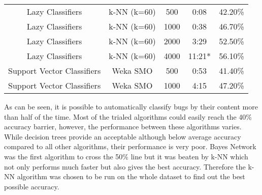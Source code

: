 \begin{tabular}{|c|c|c|c|c|}
Lazy Classifiers & k-NN (k=60) &   500  &   0:08  &    42.20\%  \\
Lazy Classifiers & k-NN (k=60) &  1000  &   0:38  &    46.70\%  \\
Lazy Classifiers & k-NN (k=60) &  2000  &   3:29  &    52.50\%  \\
Lazy Classifiers & k-NN (k=60) &  4000  &  11:21* &    56.10\%  \\

Support Vector Classifiers & Weka SMO &   500  &  0:53  &    41.40\%  \\
Support Vector Classifiers & Weka SMO &  1000  &  4:15  &    47.20\%  \\

\hline
\end{tabular}

As can be seen, it is possible to automatically classify bugs by their content more than half of the time. Most of the trialed algorithms could easily reach the 40\% accuracy barrier, however, the performance between these algorithms varies. While decision trees provide an acceptable although below average accuracy compared to all other algorithms, their performance is very poor. Bayes Network was the first algorithm to cross the 50\% line but it was beaten by k-NN which not only performs much faster but also gives the best accuracy. Therefore the k-NN algorithm was chosen to be run on the whole dataset to find out the best possible accuracy.



